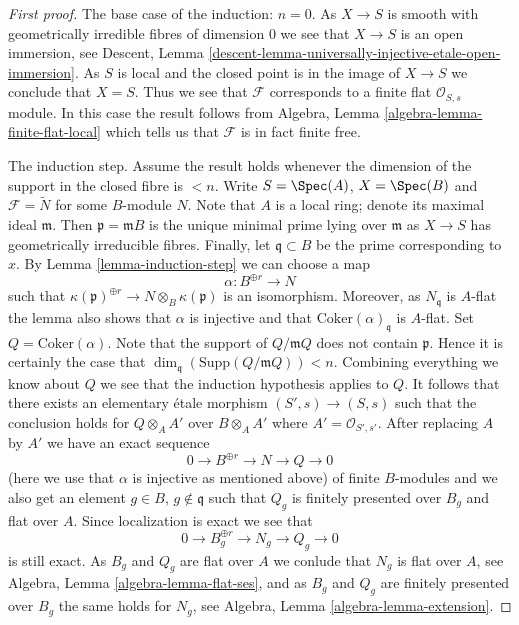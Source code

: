 \begin{proof}[First proof]
\medskip\noindent
The base case of the induction: $n = 0$.
As $X \to S$ is smooth with geometrically
irredible fibres of dimension $0$ we see that $X \to S$ is an open
immersion, see
Descent, Lemma \ref{descent-lemma-universally-injective-etale-open-immersion}.
As $S$ is local and the closed point is in the image of $X \to S$
we conclude that $X = S$. Thus we see that $\mathcal{F}$ corresponds
to a finite flat $\mathcal{O}_{S, s}$ module. In this case the result
follows from
Algebra, Lemma \ref{algebra-lemma-finite-flat-local}
which tells us that $\mathcal{F}$ is in fact finite free.

\medskip\noindent
The induction step. Assume the result holds whenever the dimension
of the support in the closed fibre is $< n$. Write $S = \Spec(A)$,
$X = \Spec(B)$ and $\mathcal{F} = \widetilde{N}$ for some $B$-module
$N$. Note that $A$ is a local ring; denote its maximal ideal $\mathfrak m$.
Then $\mathfrak p = \mathfrak mB$ is the unique minimal prime lying over
$\mathfrak m$ as $X \to S$ has geometrically irreducible fibres. Finally,
let $\mathfrak q \subset B$ be the prime corresponding to $x$. By
Lemma \ref{lemma-induction-step}
we can choose a map
$$
\alpha : B^{\oplus r} \to N
$$
such that $\kappa(\mathfrak p)^{\oplus r} \to N \otimes_B \kappa(\mathfrak p)$
is an isomorphism. Moreover, as $N_{\mathfrak q}$ is $A$-flat the lemma
also shows that $\alpha$ is injective and that
$\text{Coker}(\alpha)_{\mathfrak q}$ is $A$-flat.
Set $Q = \text{Coker}(\alpha)$. Note that the support of $Q/\mathfrak mQ$
does not contain $\mathfrak p$. Hence it is certainly the case that
$\dim_{\mathfrak q}(\text{Supp}(Q/\mathfrak mQ)) < n$.
Combining everything we know about $Q$ we see
that the induction hypothesis applies to $Q$. It follows that there exists
an elementary \'etale morphism $(S', s) \to (S, s)$ such that the conclusion
holds for $Q \otimes_A A'$ over $B \otimes_A A'$ where
$A' = \mathcal{O}_{S', s'}$. After replacing $A$ by $A'$ we have an
exact sequence
$$
0 \to B^{\oplus r} \to N \to Q \to 0
$$
(here we use that $\alpha$ is injective as mentioned above)
of finite $B$-modules and we also get an element
$g \in B$, $g \not \in \mathfrak q$ such that
$Q_g$ is finitely presented over $B_g$ and flat over $A$. Since localization
is exact we see that
$$
0 \to B_g^{\oplus r} \to N_g \to Q_g \to 0
$$
is still exact. As $B_g$ and $Q_g$ are flat over $A$ we conlude that
$N_g$ is flat over $A$, see
Algebra, Lemma \ref{algebra-lemma-flat-ses},
and as $B_g$ and $Q_g$ are finitely presented over $B_g$ the same holds
for $N_g$, see
Algebra, Lemma \ref{algebra-lemma-extension}.
\end{proof}

